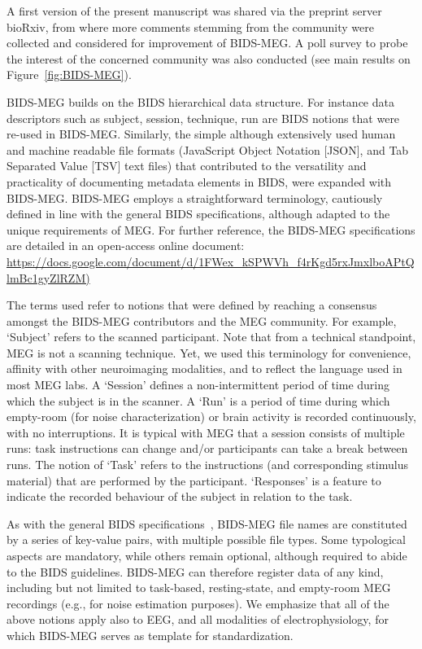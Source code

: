 A first version of the present manuscript was shared via the preprint server bioRxiv, from where more comments stemming from the community were collected and considered for improvement of BIDS-MEG. A poll survey to probe the interest of the concerned community was also conducted (see main results on Figure~\ref{fig:BIDS-MEG}).

BIDS-MEG builds on the BIDS hierarchical data structure. For instance data descriptors such as subject, session, technique, run are BIDS notions that were re-used in BIDS-MEG. Similarly, the simple although extensively used human and machine readable file formats (JavaScript Object Notation [JSON], and Tab Separated Value [TSV] text files) that contributed to the versatility and practicality of documenting metadata elements in BIDS, were expanded with BIDS-MEG. BIDS-MEG employs a straightforward terminology, cautiously defined in line with the general BIDS specifications, although adapted to the unique requirements of MEG.  For further reference, the BIDS-MEG specifications are detailed in an open-access online document:
\url{https://docs.google.com/document/d/1FWex_kSPWVh_f4rKgd5rxJmxlboAPtQlmBc1gyZlRZM)}

The terms used refer to notions that were defined by reaching a consensus amongst the BIDS-MEG contributors and the MEG community. For example, ‘Subject’ refers to the scanned participant. Note that from a technical standpoint, MEG is not a scanning technique. Yet, we used this terminology for convenience, affinity with other neuroimaging modalities, and to reflect the language used in most MEG labs. A ‘Session’ defines a non-intermittent period of time during which the subject is in the scanner.  A ‘Run’ is a period of time during which empty-room (for noise characterization) or brain activity is recorded continuously, with no interruptions. It is typical with MEG that a session consists of multiple runs: task instructions can change and/or participants can take a break between runs. The notion of ‘Task’ refers to the instructions (and corresponding stimulus material) that are performed by the participant. ‘Responses’ is a feature to indicate the recorded behaviour of the subject in relation to the task.

As with the general BIDS specifications~\citep{gorgolewski2016brain}, BIDS-MEG file names are constituted by a series of key-value pairs, with multiple possible file types. Some  typological aspects are mandatory, while others remain optional, although required to abide to the BIDS guidelines. BIDS-MEG can therefore register data of any kind, including but not limited to task-based, resting-state, and empty-room MEG recordings (e.g., for noise estimation purposes). We emphasize that all of the above notions apply also to EEG, and all modalities of electrophysiology, for which BIDS-MEG serves as template for standardization.  


